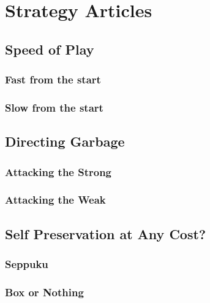 \part{Strategy Articles}
  \chapter{Speed of Play}
    \section{Fast from the start}
    \section{Slow from the start}
  \chapter{Directing Garbage}
    \section{Attacking the Strong}
    \section{Attacking the Weak}
  \chapter{Self Preservation at Any Cost?}
    \section{Seppuku}
    \section{Box or Nothing}